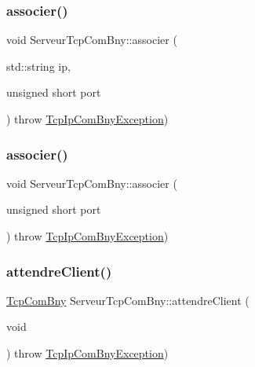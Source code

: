 \subsubsection{\texorpdfstring{associer()}{associer()}\hspace{0.1cm}{\footnotesize\ttfamily [1/2]}}
{\footnotesize\ttfamily void Serveur\+Tcp\+Com\+Bny\+::associer (\begin{DoxyParamCaption}\item[{std\+::string}]{ip,  }\item[{unsigned short}]{port }\end{DoxyParamCaption}) throw  \hyperlink{classTcpIpComBnyException}{Tcp\+Ip\+Com\+Bny\+Exception}) }

\mbox{\label{classServeurTcpComBny_a72d6e3e0f3aa7a8b644032fdd225511b}} 
\subsubsection{\texorpdfstring{associer()}{associer()}\hspace{0.1cm}{\footnotesize\ttfamily [2/2]}}
{\footnotesize\ttfamily void Serveur\+Tcp\+Com\+Bny\+::associer (\begin{DoxyParamCaption}\item[{unsigned short}]{port }\end{DoxyParamCaption}) throw  \hyperlink{classTcpIpComBnyException}{Tcp\+Ip\+Com\+Bny\+Exception}) }

\mbox{\label{classServeurTcpComBny_af1bf04352fee181c5575cbec1f0da8f1}} 
\subsubsection{\texorpdfstring{attendre\+Client()}{attendreClient()}}
{\footnotesize\ttfamily \hyperlink{classTcpComBny}{Tcp\+Com\+Bny} Serveur\+Tcp\+Com\+Bny\+::attendre\+Client (\begin{DoxyParamCaption}\item[{void}]{ }\end{DoxyParamCaption}) throw  \hyperlink{classTcpIpComBnyException}{Tcp\+Ip\+Com\+Bny\+Exception}) }


